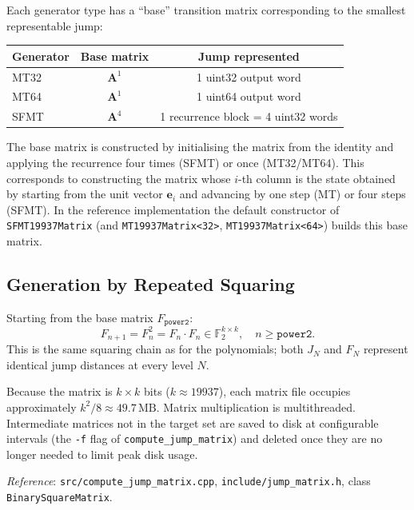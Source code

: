 \documentclass{article}
\begin{document}
Each generator type has a ``base'' transition matrix corresponding to the smallest
representable jump:

\begin{center}
\begin{tabular}{lcc}
\toprule
Generator & Base matrix & Jump represented \\
\midrule
MT32 & $\mathbf{A}^1$ & 1 uint32 output word \\
MT64 & $\mathbf{A}^1$ & 1 uint64 output word \\
SFMT & $\mathbf{A}^4$ & 1 recurrence block = 4 uint32 words \\
\bottomrule
\end{tabular}
\end{center}

The base matrix is constructed by initialising the matrix from the identity and applying
the recurrence four times (SFMT) or once (MT32/MT64).  This corresponds to constructing
the matrix whose $i$-th column is the state obtained by starting from the unit vector
$\mathbf{e}_i$ and advancing by one step (MT) or four steps (SFMT).  In the reference
implementation the default constructor of \texttt{SFMT19937Matrix} (and
\texttt{MT19937Matrix<32>}, \texttt{MT19937Matrix<64>}) builds this base matrix.

\subsection{Generation by Repeated Squaring}

Starting from the base matrix $F_{\mathtt{power2}}$:
\begin{equation}
  F_{n+1} = F_n^2 = F_n \cdot F_n \in \mathbb{F}_2^{k \times k}, \quad n \geq \mathtt{power2}.
\end{equation}
This is the same squaring chain as for the polynomials; both $J_N$ and $F_N$ represent
identical jump distances at every level $N$.

Because the matrix is $k \times k$ bits ($k \approx 19937$), each matrix file occupies
approximately $k^2 / 8 \approx 49.7\,\text{MB}$.  Matrix multiplication is multithreaded.
Intermediate matrices not in the target set are saved to disk at configurable intervals
(the \texttt{-f} flag of \texttt{compute\_jump\_matrix}) and deleted once they are no
longer needed to limit peak disk usage.

\noindent\textit{Reference}: \texttt{src/compute\_jump\_matrix.cpp},
\texttt{include/jump\_matrix.h}, class \texttt{BinarySquareMatrix}.
\end{document}
